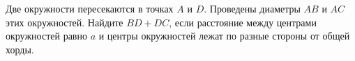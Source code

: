 \begin{ex}
	\begin{condition}
		Две окружности пересекаются в точках \( A  \) и \( D \). Проведены диаметры \( AB  \) и \( AC  \) этих окружностей. Найдите \( BD+DC \), если расстояние между центрами окружностей равно \( a  \) и центры окружностей лежат по разные стороны от общей хорды.
	\end{condition}
\end{ex}
